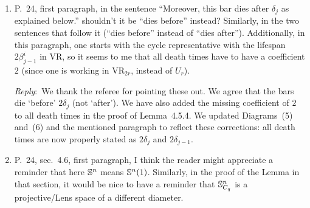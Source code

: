 \documentclass{amsart}
\newcommand{\ar}{\medskip\noindent\textit{Reply}:\ }
\begin{document}
\begin{enumerate}
		\ar We thank the referee for pointing out the gap in the proof. We have followed the referee's suggestion and modified the proof as follows to fill the gap:

		\medskip
		\begin{quote}
			We claim that $d_{\bS}(x_i^*, x_j^*) < r$ for all $1 \le i,j \le k$.
			If this is not the case, then there exist indices $i,j$ and $1 \leq a \leq q-1$ such that $d_{\bS}(x_i^*, \omega^a x_j^*) < r$.
			Applying the triangle inequality to $x_i^*, x_j^*$ and $x_0$, we have
			\[d_{\bS}(x_i^*, x_j^*) \leq d_{\bS}(x_i^*, x_0) + d_{\bS}(x_0, x_j^*) < 2r.\]
			On the other hand, applying the triangle inequality to $x_i^*, x_j^*$ and $\omega^a x_j^*$, we have
			\[
			d_{\bS}(x_i^*, x_j^*) \geq d_{\bS}(x_j^*, \omega^a x_j^*) - d_{\bS}(x_i^*, \omega^a x_j^*) > \frac{2\pi}{q} - r,
			\]
			given $1 \leq a \leq q-1$.
			Combining the above two inequalities, since $q \geq 2$, we have
			\[
			2r > \frac{2\pi}{q} - r \implies r > \frac{2\pi}{3q} \geq \frac{2\pi}{q(q+1)},
			\]
			which contradicts the assumption $r \le \frac{2\pi}{q(q+1)}$.
			Thus, $d_{\bS}(x_i^*, x_j^*) < r$ holds for all $1 \le i,j \le k$, completing the proof of the claim.
		\end{quote}

		\item P.~24, first paragraph, in the sentence ``Moreover, this bar dies after $\delta_j$ as explained below.'' shouldn’t it be ``dies before'' instead? Similarly, in the two sentences that follow it (``dies before'' instead of ``dies after'').
		Additionally, in this paragraph, one starts with the cycle representative with the lifespan $2\beta_{j-1}^i$ in $\mathrm{VR}$, so it seems to me that all
		death times have to have a coefficient $2$ (since one is working in $\mathrm{VR}_{2r}$, instead of $U_r$).


		\ar We thank the referee for pointing these out. We agree that the bars die `before' $2\delta_j$ (not `after'). We have also added the missing coefficient of $2$ to all death times in the proof of Lemma~4.5.4. We updated Diagrams~(5) and~(6) and the mentioned paragraph to reflect these corrections: all death times are now properly stated as $2\delta_j$ and $2\delta_{j-1}$.

		\item P.~24, sec.~4.6, first paragraph, I think the reader might appreciate a reminder that here $\mathbb{S}^n$ means $\mathbb{S}^n(1)$.
		Similarly, in the proof of the Lemma in that section, it would be nice to have a reminder that $\mathbb{S}^n_{C_q}$ is a projective/Lens space of a different diameter.


\end{enumerate}
\end{document}
